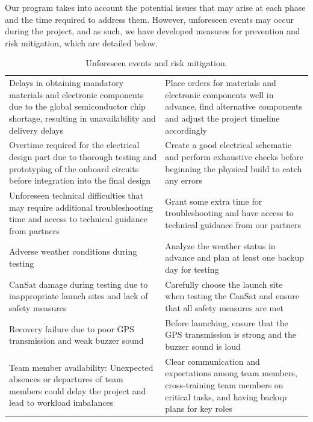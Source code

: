 \documentclass[11pt]{article}
\begin{document}
Our program takes into account the potential issues that may arise at each phase and the time required to address them. However, unforeseen events may occur during the project, and as such, we have developed measures for prevention and risk mitigation, which are detailed below.

\begin{table}[htbp]
\centering
{}
\begin{tabular}{>{\raggedright\arraybackslash}p{8cm}>{\raggedright\arraybackslash}p{7cm}}
\rowcolor{CDOSRPrimary}
\hline
\multicolumn{1}{c}{\textbf{\color{white!50}{Major risks}}} & \multicolumn{1}{c}{\textbf{\color{white!50}{Mitigation}}} \\
\hline
Delays in obtaining mandatory materials and electronic components due to the global semiconductor chip shortage, resulting in unavailability and delivery delays & Place orders for materials and electronic components well in advance, find alternative components and adjust the project timeline accordingly \\
\rowcolor{LightCyan1!50}Overtime required for the electrical design part due to thorough testing and prototyping of the onboard circuits before integration into the final design & Create a good electrical schematic and perform exhaustive checks before beginning the physical build to catch any errors \\
Unforeseen technical difficulties that may require additional troubleshooting time and access to technical guidance from partners & Grant some extra time for troubleshooting and have access to technical guidance from our partners \\
\rowcolor{LightCyan1!50}Adverse weather conditions during testing & Analyze the weather status in advance and plan at least one backup day for testing \\
CanSat damage during testing due to inappropriate launch sites and lack of safety measures & Carefully choose the launch site when testing the CanSat and ensure that all safety measures are met \\
\rowcolor{LightCyan1!50}Recovery failure due to poor GPS transmission and weak buzzer sound & Before launching, ensure that the GPS transmission is strong and the buzzer sound is loud \\
Team member availability: Unexpected absences or departures of team members could delay the project and lead to workload imbalances & Clear communication and expectations among team members, cross-training team members on critical tasks, and having backup plans for key roles \\
\hline
\end{tabular}
\caption{Unforeseen events and risk mitigation.}
\label{tab:risks}
\end{table}
\end{document}
